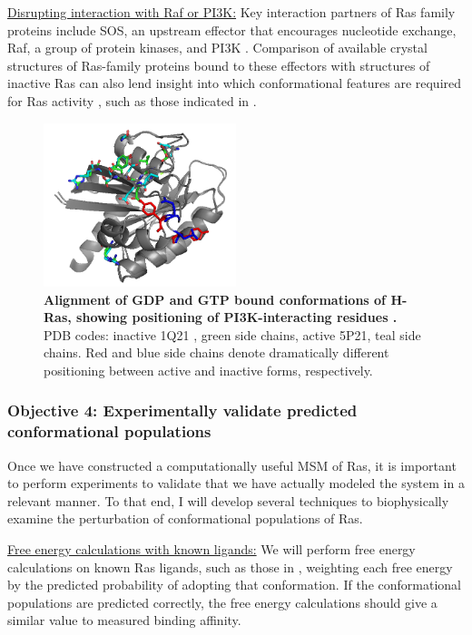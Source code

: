\documentclass[12pt]{article}
\begin{document}
  \underline{Disrupting interaction with Raf or PI3K:} Key interaction partners of Ras family proteins include SOS, an upstream effector that encourages nucleotide exchange, Raf, a group of protein kinases, and PI3K \cite{pyla}. Comparison of available crystal structures of Ras-family proteins bound to these effectors with structures of inactive Ras can also lend insight into which conformational features are required for Ras activity \cite{pi3k}, such as those indicated in . 
  \begin{figure}[H]
  \centering
  \includegraphics[width=0.5\textwidth]{ras_actvinact.png}
  \caption{\textbf{Alignment of GDP and GTP bound conformations of H-Ras, showing positioning of PI3K-interacting residues \cite{pi3k}.} PDB codes: inactive 1Q21 \cite{rasgdp}, green side chains, active 5P21\cite{rasgtp}, teal side chains. Red and blue side chains denote dramatically different positioning between active and inactive forms, respectively.}
  \label{raspi3kinteraction}
  \end{figure}
  
  \subsubsection*{Objective 4: Experimentally validate predicted conformational populations}
  
  Once we have constructed a computationally useful MSM of Ras, it is important to perform experiments to validate that we have actually modeled the system in a relevant manner. To that end, I will develop several techniques to biophysically examine the perturbation of conformational populations of Ras.

\underline{Free energy calculations with known ligands:} We will perform free energy calculations on known Ras ligands, such as those in \cite{fesik} , weighting each free energy by the predicted probability of adopting that conformation. If the conformational populations are predicted correctly, the free energy calculations should give a similar value to measured binding affinity.
  
\end{document}
